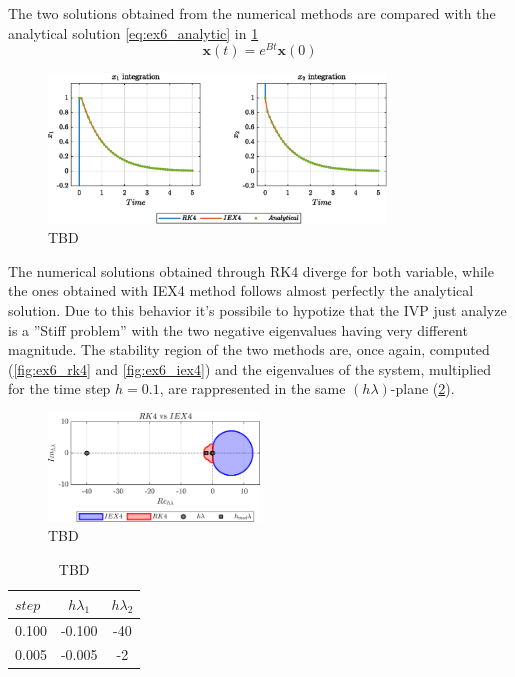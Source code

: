 \documentclass[11pt,a4paper,oneside]{article}
\renewcommand{\vec}[1]{\mathbf{#1}}
\begin{document}
The two solutions obtained from the numerical methods are compared with the analytical solution \cref{eq:ex6_analytic} in \cref{fig:ex6_integration}
\begin{equation}
    \vec{x}(t) = e^{Bt}\vec{x}(0)
    \label{eq:ex6_analytic}
\end{equation}

\begin{figure}[htb]
    \centering
    \includegraphics*[width=0.8\textwidth, keepaspectratio]{ex6_integOutput.eps}
    \caption[]{\label{fig:ex6_integration} TBD}
\end{figure}

The numerical solutions obtained through RK4 diverge for both variable, while the ones obtained with IEX4 method follows almost perfectly the analytical solution.
Due to this behavior it's possibile to hypotize that the IVP just analyze is a ''Stiff problem'' with the two negative eigenvalues having very different magnitude.
The stability region of the two methods are, once again, computed (\cref{fig:ex6_rk4} and \cref{fig:ex6_iex4}) and the eigenvalues of the system, multiplied for the time step $h=0.1$, are rappresented in the same $(h\lambda)$-plane (\cref{fig:ex6_stabReg}).  

\begin{figure}[htb]
    \centering
    \includegraphics*[width=0.5\textwidth, keepaspectratio]{ex6_stabReg.png}
    \caption[]{\label{fig:ex6_stabReg} TBD}
\end{figure}

\begin{table}[htb]
    \centering
    \begin{tabular}{lcc}
            \toprule
            \toprule
            $step$&  $h\lambda_1$& $h\lambda_2$ \\ 
            \midrule
            0.100 & -0.100 & -40\\
            0.005 & -0.005 & -2\\
            \bottomrule
            \bottomrule
        \end{tabular}
    \caption{TBD}
    \label{tab:ex6_eigs}
\end{table}
\end{document}
